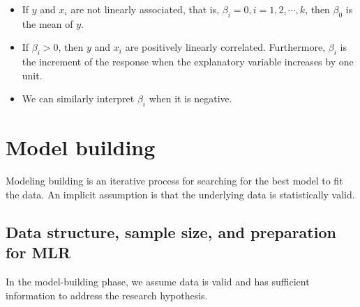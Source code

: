 \documentclass[
]{book}
\begin{document}
\begin{itemize}
\item
  If \(y\) and \(x_i\) are not linearly associated, that is, \(\beta_i = 0, i = 1, 2, \cdots, k\), then \(\beta_0\) is the mean of \(y\).
\item
  If \(\beta_i > 0\), then \(y\) and \(x_i\) are positively linearly correlated. Furthermore, \(\beta_i\) is the increment of the response when the explanatory variable increases by one unit.
\item
  We can similarly interpret \(\beta_i\) when it is negative.
\end{itemize}

\hypertarget{model-building}{%
\section{Model building}\label{model-building}}

Modeling building is an iterative process for searching for the best model to fit the data. An implicit assumption is that the underlying data is statistically valid.

\hypertarget{data-structure-sample-size-and-preparation-for-mlr}{%
\subsection{Data structure, sample size, and preparation for MLR}\label{data-structure-sample-size-and-preparation-for-mlr}}

In the model-building phase, we assume data is valid and has sufficient information to address the research hypothesis.
\end{document}
